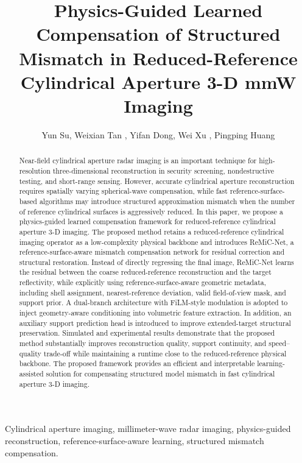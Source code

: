 \documentclass[journal]{IEEEtran}
\title{Physics-Guided Learned Compensation of Structured Mismatch in Reduced-Reference Cylindrical Aperture 3-D mmW Imaging}
\author{Yun Su\orcidlink{0009-0008-5831-9344}, Weixian Tan\orcidlink{0000-0001-9071-9470} \IEEEmembership{Member, IEEE}, Yifan Dong\orcidlink{0000-0002-3155-6437}, Wei Xu\orcidlink{0000-0002-8045-8817} \IEEEmembership{Member, IEEE}, Pingping Huang\orcidlink{0000-0001-7720-1183} \IEEEmembership{Member, IEEE}
}
\begin{document}
\maketitle

\begin{abstract}
Near-field cylindrical aperture radar imaging is an important technique for high-resolution three-dimensional reconstruction in security screening, nondestructive testing, and short-range sensing. However, accurate cylindrical aperture reconstruction requires spatially varying spherical-wave compensation, while fast reference-surface-based algorithms may introduce structured approximation mismatch when the number of reference cylindrical surfaces is aggressively reduced. In this paper, we propose a physics-guided learned compensation framework for reduced-reference cylindrical aperture 3-D imaging. The proposed method retains a reduced-reference cylindrical imaging operator as a low-complexity physical backbone and introduces ReMiC-Net, a reference-surface-aware mismatch compensation network for residual correction and structural restoration. Instead of directly regressing the final image, ReMiC-Net learns the residual between the coarse reduced-reference reconstruction and the target reflectivity, while explicitly using reference-surface-aware geometric metadata, including shell assignment, nearest-reference deviation, valid field-of-view mask, and support prior. A dual-branch architecture with FiLM-style modulation is adopted to inject geometry-aware conditioning into volumetric feature extraction. In addition, an auxiliary support prediction head is introduced to improve extended-target structural preservation. Simulated and experimental results demonstrate that the proposed method substantially improves reconstruction quality, support continuity, and speed--quality trade-off while maintaining a runtime close to the reduced-reference physical backbone. The proposed framework provides an efficient and interpretable learning-assisted solution for compensating structured model mismatch in fast cylindrical aperture 3-D imaging.
\end{abstract}

\begin{IEEEkeywords}
Cylindrical aperture imaging, millimeter-wave radar imaging, physics-guided reconstruction, reference-surface-aware learning, structured mismatch compensation.
\end{IEEEkeywords}
\end{document}

